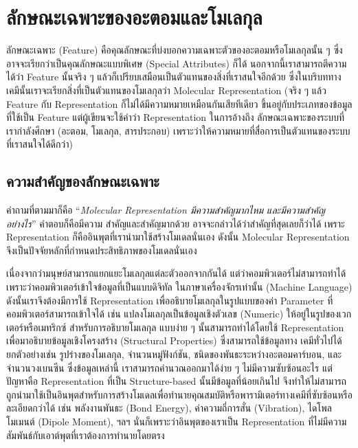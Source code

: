 

\chapter{ลักษณะเฉพาะของอะตอมและโมเลกุล}
\label{ch:feature}

ลักษณะเฉพาะ (Feature) คือคุณลักษณะที่บ่งบอกความเฉพาะตัวของอะตอมหรือโมเลกุลนั้น ๆ ซึ่งอาจจะเรียกว่าเป็นคุณลักษณะแบบพิเศษ 
(Special Attributes) ก็ได้ นอกจากนี้เราสามารถตีความได้ว่า Feature นั้นจริง ๆ แล้วก็เปรียบเสมือนเป็นตัวแทนของสิ่งที่เราสนใจอีกด้วย 
ซึ่งในบริบททางเคมีนั้นเราจะเรียกสิ่งที่เป็นตัวแทนของโมเลกุลว่า Molecular Representation (จริง ๆ แล้ว Feature กับ Representation 
ก็ไม่ได้มีความหมายเหมือนกันเสียทีเดียว ขึ้นอยู่กับประเภทของข้อมูลที่ใช้เป็น Feature แต่ผู้เขียนจะใช้คำว่า Representation ในการอ้างถึง%
ลักษณะเฉพาะของระบบที่เรากำลังศึกษา (อะตอม, โมเลกุล, สารประกอบ) เพราะว่าให้ความหมายที่สื่อการเป็นตัวแทนของระบบที่เราสนใจได้ดีกว่า)
\autocite{stepisnik2021}

\section{ความสำคัญของลักษณะเฉพาะ}
\label{sec:why_feature}

คำถามที่ตามมาก็คือ \enquote{\textit{Molecular Representation มีความสำคัญมากไหม และมีความสำคัญอย่างไร}} คำตอบก็คือมีความ%
สำคัญและสำคัญมากด้วย อาจจะกล่าวได้ว่าสำคัญที่สุดเลยก็ว่าได้ เพราะ Representation ก็คืออินพุตที่เรานำมาใช้สร้างโมเดลนั่นเอง 
ดังนั้น Molecular Representation จึงเป็นปัจจัยหลักที่กำหนดประสิทธิภาพของโมเดลนั่นเอง 

เนื่องจากว่ามนุษย์สามารถแยกแยะโมเลกุลแต่ละตัวออกจากกันได้ แต่ว่าคอมพิวเตอร์ไม่สามารถทำได้เพราะว่าคอมพิวเตอร์เข้าใจข้อมูลที่เป็นแบบดิจิทัล%
ในภาษาเครื่องจักรเท่านั้น (Machine Language) ดังนั้นเราจึงต้องมีการใช้ Representation เพื่ออธิบายโมเลกุลในรูปแบบของค่า Parameter 
ที่คอมพิวเตอร์สามารถเข้าใจได้ เช่น แปลงโมเลกุลเป็นข้อมูลเชิงตัวเลข (Numeric) ให้อยู่ในรูปของเวกเตอร์หรือเมทริกซ์ สำหรับการอธิบายโมเลกุล%
แบบง่าย ๆ นั้นสามารถทำได้โดยใช้ Representation เพื่อมาอธิบายข้อมูลเชิงโครงสร้าง (Structural Properties) ซึ่งสามารถใช้ข้อมูลทาง%
เคมีทั่วไปได้ ยกตัวอย่างเช่น รูปร่างของโมเลกุล, จำนวนหมู่ฟังก์ชัน, ชนิดของพันธะระหว่างอะตอมคาร์บอน, และจำนวนวงเบนซีน ซึ่งข้อมูลเหล่านี้%
เราสามารถคำนวณออกมาได้ง่าย ๆ ไม่มีความซับซ้อนอะไร แต่ปัญหาคือ Representation ที่เป็น Structure-based นั้นมีข้อมูลที่น้อยเกินไป 
จึงทำให้ไม่สามารถถูกนำมาใช้เป็นอินพุตสำหรับการสร้างโมเดลเพื่อทำนายคุณสมบัติหรือพารามิเตอร์ทางเคมีที่ซับซ้อนหรือละเอียดกว่าได้ เช่น 
พลังงานพันธะ (Bond Energy), ค่าความถี่การสั่น (Vibration), ไดโพลโมเมนต์ (Dipole Moment), ฯลฯ นั่นก็เพราะว่าอินพุตของเราเป็น 
Representation ที่ไม่มีความสัมพันธ์กับเอาต์พุตที่เราต้องการทำนายโดยตรง


